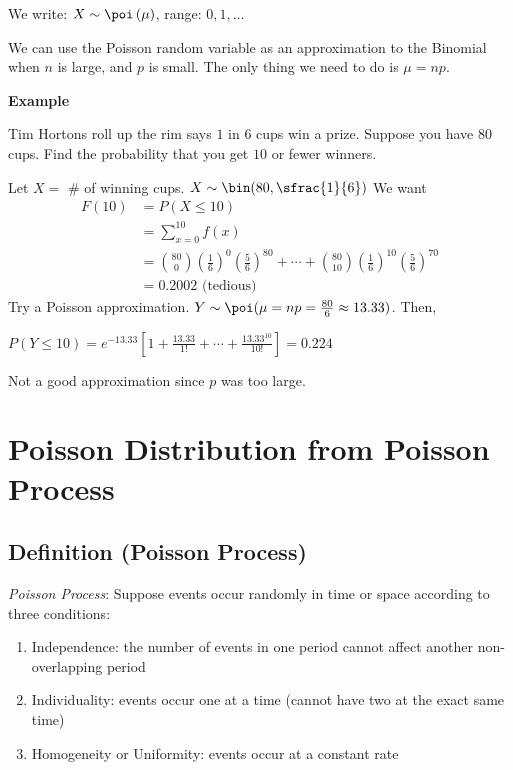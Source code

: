 We write: $ X \sim \poi\left(\mu\right) $, range: $ 0,1,\ldots $

We can use the Poisson random variable as an approximation to the Binomial
when $ n $ is large, and $ p $ is small. The only thing we need to do
is $ \mu=np $.

\textbf{Example}

Tim Hortons roll up the rim says $ 1 $ in $ 6 $ cups win a prize. Suppose
you have $ 80 $ cups. Find the probability that you get $ 10 $ or fewer
winners.

Let $ X= $ \# of winning cups. $ X \sim \bin(80,\sfrac{1}{6}) $
We want
\begin{align*}
    F(10) & =P(X\le 10)                                                                   \\
          & =\sum\limits_{x=0}^{10} f(x)                                                  \\
          & =\binom{80}{0}\left(\frac{1}{6}\right)^0\left(\frac{5}{6}\right)^{80}+\cdots+
    \binom{80}{10}\left(\frac{1}{6}\right)^{10}\left(\frac{5}{6}\right)^{70}              \\
          & =0.2002 \text{ (tedious) }
\end{align*}
Try a Poisson approximation.
$ Y \sim \poi(\mu=np=\frac{80}{6}\approx 13.33) $. Then,

$ P(Y\le 10)=e^{-13.33}\left[1+\frac{13.33}{1!}+\cdots+\frac{13.33^{10}}{10!}\right]=0.224 $

Not a good approximation since $ p $ was too large.

\section{Poisson Distribution from Poisson Process}

\begin{defbox}
    \subsection{Definition (Poisson Process)}
    \emph{Poisson Process}:
    Suppose events occur randomly in time or space according to three conditions:
    \begin{enumerate}[label=(\arabic*)]
        \item Independence: the number of events in one period cannot affect another non-overlapping period
        \item Individuality: events occur one at a time (cannot have two at the exact same time)
        \item Homogeneity or Uniformity: events occur at a constant rate
    \end{enumerate}
\end{defbox}
